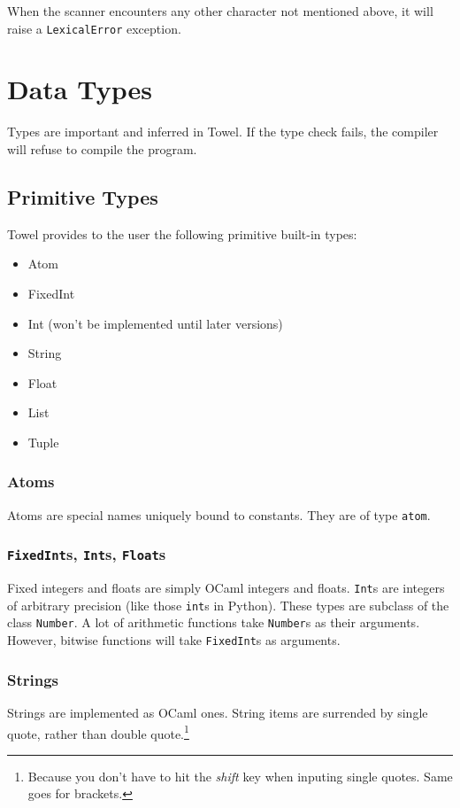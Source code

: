 \documentclass{book}
\begin{document}
When the scanner encounters any other character not mentioned above, it will raise a \texttt{LexicalError} exception.

\chapter{Data Types}
\label{chap:data-types}

Types are important and inferred in Towel. If the type check fails, the compiler will refuse to compile the program.

\section{Primitive Types}
Towel provides to the user the following primitive built-in types:
\begin{itemize}
\item Atom
\item FixedInt
\item Int (won't be implemented until later versions)
\item String
\item Float
\item List
\item Tuple
\end{itemize}

\subsection{Atoms}
Atoms are special names uniquely bound to constants. They are of type \texttt{atom}.

\subsection{\texttt{FixedInt}s, \texttt{Int}s, \texttt{Float}s}
Fixed integers and floats are simply OCaml integers and floats. \texttt{Int}s are integers of arbitrary precision (like those \texttt{int}s in Python). These types are subclass of the class \texttt{Number}. A lot of arithmetic functions take \texttt{Number}s as their arguments. However, bitwise functions will take \texttt{FixedInt}s as arguments.

\subsection{Strings}
Strings are implemented as OCaml ones. String items are surrended by single quote, rather than double quote.\footnote{Because you don't have to hit the \textit{shift} key when inputing single quotes. Same goes for brackets.}
\end{document}
